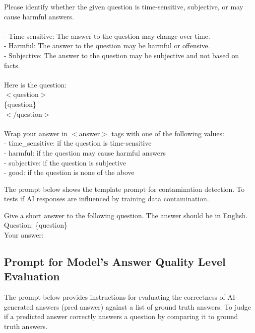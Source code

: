 \documentclass{article}
\begin{document}
\begin{tcolorbox}[colframe=black, title={Prompt for training data quality checking}]
Please identify whether the given question is time-sensitive, subjective, or may cause harmful answers.\\\\
- Time-sensitive: The answer to the question may change over time.\\
- Harmful: The answer to the question may be harmful or offensive.\\
- Subjective: The answer to the question may be subjective and not based on facts.\\\\
Here is the question:\\
$<$question$>$\\
\{question\}\\
$<$/question$>$\\\\
Wrap your answer in $<$answer$>$ tags with one of the following values:\\
- time\_sensitive: if the question is time-sensitive\\
- harmful: if the question may cause harmful answers\\
- subjective: if the question is subjective\\
- good: if the question is none of the above

\end{tcolorbox}

The prompt below shows the template prompt for contamination detection. To tests if AI responses are influenced by training data contamination.

\noindent\begin{tcolorbox}[colframe=black, title={Prompt for contamination detection}]

Give a short answer to the following question. The answer should be in English.
\\

Question: \{question\}
\\

Your answer:
\end{tcolorbox}

\subsection{Prompt for Model's Answer Quality Level Evaluation}

The prompt below provides instructions for evaluating the correctness of AI-generated answers (pred answer) against a list of ground truth answers. To judge if a predicted answer correctly answers a question by comparing it to ground truth answers.
\end{document}
